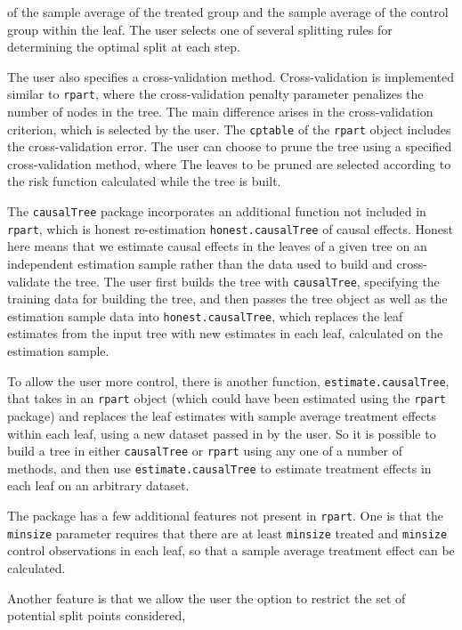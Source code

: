 \documentclass[11pt]{article}
\begin{document}
of the sample average of the treated group and the sample average of the control group within the leaf. The user selects one of several splitting rules for determining the optimal split
at each step.\par
The user also specifies a cross-validation method.  Cross-validation is implemented similar to \texttt{rpart}, where the cross-validation penalty parameter
penalizes the number of nodes in the tree.  The main difference arises in the cross-validation criterion, which is
selected by the user.  The \texttt{cptable} of the \texttt{rpart} object includes the cross-validation error.   The user can choose to prune the tree using a specified cross-validation method, where  The leaves to be pruned are selected according to the risk function calculated while
the tree is built. \par
The \texttt{causalTree} package incorporates an additional function not included in \texttt{rpart}, which is honest re-estimation \texttt{honest.causalTree} of causal effects. Honest here means that we estimate causal effects in the leaves of a given tree on an independent estimation sample rather than the data used to build and cross-validate the tree.  The user first builds the tree
with \texttt{causalTree}, specifying the training data for building the tree, and then passes the tree object as well as the estimation sample data
into \texttt{honest.causalTree}, which replaces the leaf estimates from the input tree with new estimates in each leaf, calculated on the estimation sample.\par
To allow the user more control, there is another function, \texttt{estimate.causalTree}, that takes in an \texttt{rpart} object (which could have been estimated using the \texttt{rpart} package) and
replaces the leaf estimates with sample average treatment effects within each leaf, using a new dataset passed in by the user.  So it is possible to build a tree in either \texttt{causalTree}
or \texttt{rpart} using any one of a number of methods, and
then use \texttt{estimate.causalTree} to estimate treatment effects in each leaf on an arbitrary dataset. \par
The package has a few additional features not present in \texttt{rpart}.  One is that the \texttt{minsize} parameter requires that there are at least \texttt{minsize} treated and
\texttt{minsize} control observations in each leaf, so that a sample average treatment effect can be calculated. \par
Another feature is that we allow the user the option to restrict the set of potential split points considered,
\end{document}
